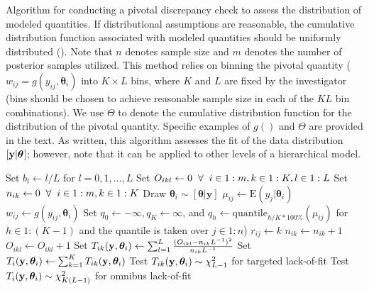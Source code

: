 \documentclass[12pt,english]{article}
\begin{document}
\begin{spacing}{1.9}
\begin{algorithm}
\caption{Algorithm for conducting a pivotal discrepancy check to assess the distribution of modeled quantities.  If distributional assumptions are reasonable, the cumulative distribution function associated with modeled quantities should be uniformly distributed (\citep{Johnson2004,YuanJohnson2012}). Note that $n$ denotes sample size and $m$ denotes the number of posterior samples utilized.  This method relies on binning the pivotal quantity ($w_{ij} = g(y_{ij},\boldsymbol{\theta}_i)$ into $K \times L$ bins, where $K$ and $L$ are fixed by the investigator (bins should be chosen to achieve reasonable sample size in each of the $KL$ bin combinations).  We use $\Theta$ to denote the cumulative distribution function for the distribution of the pivotal quantity.  Specific examples of $g()$ and $\Theta$ are provided in the text.  As written, this algorithm assesses the fit of the data distribution $[{\bf y}|\boldsymbol{\theta}$]; however, note that it can be applied to other levels of a hierarchical model.}
\label{alg:pivot}
\begin{algorithmic}
\STATE Set $b_l \leftarrow l/L$ for $l=0,1,\hdots,L$
\STATE Set $O_{ikl} \leftarrow 0 \hspace{2mm} \forall \hspace{2mm} i \in 1:m, k \in 1:K, l \in 1:L$
\STATE Set $n_{ik} \leftarrow 0 \hspace{2mm} \forall \hspace{2mm} i \in 1:m, k \in 1:K$
  \STATE Draw $\boldsymbol{\theta}_i \sim [\boldsymbol{\theta}|\textbf{y}]$
    \STATE $\mu_{ij} \leftarrow \textrm{E}(y_j|\boldsymbol{\theta}_i)$
    \STATE $w_{ij} \leftarrow g(y_{ij},\boldsymbol{\theta}_i)$
  \ENDFOR
  \STATE Set $q_0 \leftarrow -\infty, q_{K} \leftarrow \infty$, and $q_h \leftarrow \textrm{quantile}_{h/K*100\%}(\mu_{ij})$ for $h \in 1:(K-1)$ and the quantile is taken over $j \in 1:n$)
        \STATE $r_{ij} \leftarrow k$
        \STATE $n_{ik} \leftarrow n_{ik}+1$
      \ENDIF
    \ENDFOR
      \IF{$\Theta(w_{ij}) \in (b_{l-1},b_l]$ \& $r_{ij}=k$}
        \STATE $O_{ikl} \leftarrow O_{ikl}+1$
      \ENDIF
    \ENDFOR
    \STATE Set $T_{ik}({\bf y},\boldsymbol{\theta}_i) \leftarrow \sum_{l=1}^L \frac{(O_{ikl}-n_{ik}L^{-1})^2}{n_{ik}L^{-1}} $
  \ENDFOR
  \STATE Set $T_i({\bf y},\boldsymbol{\theta}_i) \leftarrow \sum_{k=1}^K T_{ik}({\bf y},\boldsymbol{\theta}_i)$
\ENDFOR
\STATE Test $T_{ik}({\bf y},\boldsymbol{\theta}_i) \sim \chi^2_{L-1}$ for targeted lack-of-fit
\STATE Test $T_{i}({\bf y},\boldsymbol{\theta}_i) \sim \chi^2_{K(L-1)}$ for omnibus lack-of-fit
\end{algorithmic}
\end{algorithm}



\end{spacing}
\end{document}
